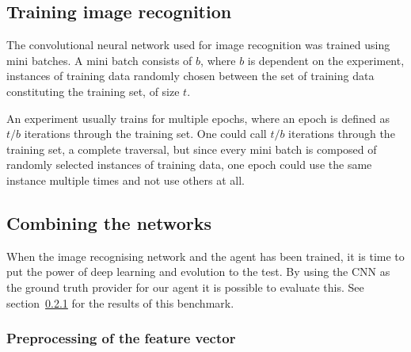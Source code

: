 \subsection{Training image recognition}
The convolutional neural network used for image recognition was trained using mini batches. A mini batch consists of $b$, where $b$ is dependent on the experiment, instances of training data randomly chosen between the set of training data constituting the training set, of size $t$.

An experiment usually trains for multiple epochs, where an epoch is defined as $t/b$ iterations through the training set. One could call $t/b$ iterations through the training set, a complete traversal, but since every mini batch is composed of randomly selected instances of training data, one epoch could use the same instance multiple times and not use others at all.

\subsection{Combining the networks}
When the image recognising network and the agent has been trained, it is time to put the power of deep learning and evolution to the test. By using the CNN as the ground truth provider for our agent it is possible to evaluate this. See section~\ref{} for the results of this benchmark.
\subsubsection{Preprocessing of the feature vector}
















































